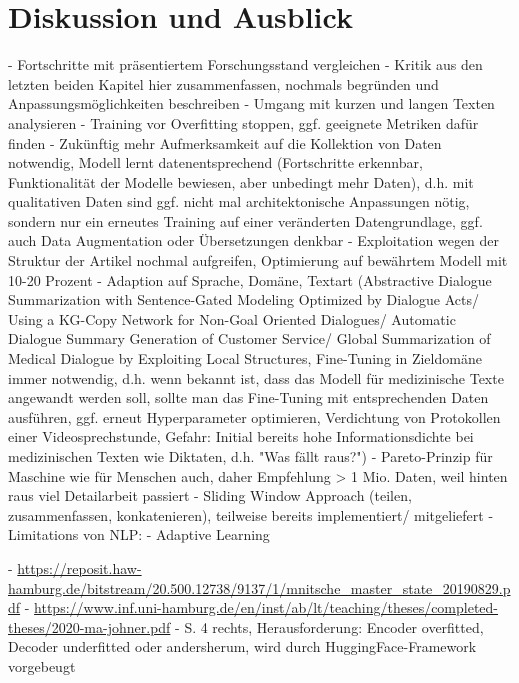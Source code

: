 \chapter{Diskussion und Ausblick}
\thispagestyle{fancy}
\label{chap:Diskussion und Ausblick}

- Fortschritte mit präsentiertem Forschungsstand vergleichen
- Kritik aus den letzten beiden Kapitel hier zusammenfassen, nochmals begründen und Anpassungsmöglichkeiten beschreiben
- Umgang mit kurzen und langen Texten analysieren
- Training vor Overfitting stoppen, ggf. geeignete Metriken dafür finden
- Zukünftig mehr Aufmerksamkeit auf die Kollektion von Daten notwendig, Modell lernt datenentsprechend (Fortschritte erkennbar, Funktionalität der Modelle bewiesen, aber unbedingt mehr Daten), d.h. mit qualitativen Daten sind ggf. nicht mal architektonische Anpassungen nötig, sondern nur ein erneutes Training auf einer veränderten Datengrundlage, ggf. auch Data Augmentation oder Übersetzungen denkbar
- Exploitation wegen der Struktur der Artikel nochmal aufgreifen, Optimierung auf bewährtem Modell mit 10-20 Prozent
- Adaption auf Sprache, Domäne, Textart (Abstractive Dialogue Summarization with Sentence-Gated Modeling Optimized by Dialogue Acts/ Using a KG-Copy Network for Non-Goal Oriented Dialogues/ Automatic Dialogue Summary Generation of Customer Service/ Global Summarization of Medical Dialogue by Exploiting Local Structures, Fine-Tuning in Zieldomäne immer notwendig, d.h. wenn bekannt ist, dass das Modell für medizinische Texte angewandt werden soll, sollte man das Fine-Tuning mit entsprechenden Daten ausführen, ggf. erneut Hyperparameter optimieren, Verdichtung von Protokollen einer Videosprechstunde, Gefahr: Initial bereits hohe Informationsdichte bei medizinischen Texten wie Diktaten, d.h. "Was fällt raus?")
- Pareto-Prinzip für Maschine wie für Menschen auch, daher Empfehlung > 1 Mio. Daten, weil hinten raus viel Detailarbeit passiert
- Sliding Window Approach (teilen, zusammenfassen, konkatenieren), teilweise bereits implementiert/ mitgeliefert
- Limitations von NLP: \cite[S.~30-31]{BIR09}
- Adaptive Learning

- \url{https://reposit.haw-hamburg.de/bitstream/20.500.12738/9137/1/mnitsche_master_state_20190829.pdf}
- \url{https://www.inf.uni-hamburg.de/en/inst/ab/lt/teaching/theses/completed-theses/2020-ma-johner.pdf}
- \cite{YAN19} S. 4 rechts, Herausforderung: Encoder overfitted, Decoder underfitted oder andersherum, wird durch HuggingFace-Framework vorgebeugt
